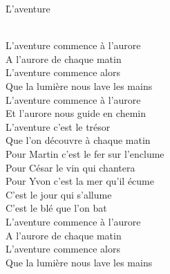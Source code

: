 \documentclass{novel}
\begin{document}
\newpage
\normalsize
\h*{L’aventure}

\setlength{\leftskip}{2cm}
\begin{bfseries}
[Refrain:]\\
L'aventure commence à l'aurore \\
A l'aurore de chaque matin \\
L'aventure commence alors \\
Que la lumière nous lave les mains \\

L'aventure commence à l'aurore \\
Et l'aurore nous guide en chemin \\
L'aventure c'est le trésor \\
Que l'on découvre à chaque matin \\

Pour Martin c'est le fer sur l'enclume \\
Pour César le vin qui chantera \\
Pour Yvon c'est la mer qu'il écume \\
C'est le jour qui s'allume \\
C'est le blé que l'on bat \\

L'aventure commence à l'aurore \\
A l'aurore de chaque matin \\
L'aventure commence alors \\
Que la lumière nous lave les mains \\
\end{bfseries}
\end{document}
